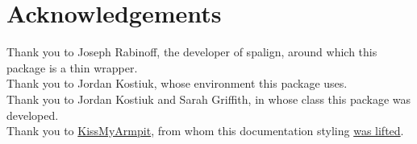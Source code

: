 \documentclass{article}
\begin{document}
\section{Acknowledgements}
Thank you to Joseph Rabinoff, the developer of spalign, around which this package is a thin wrapper.\\
Thank you to Jordan Kostiuk, whose environment this package uses.\\
Thank you to Jordan Kostiuk and Sarah Griffith, in whose class this package was developed.\\
Thank you to \href{https://tex.stackexchange.com/users/19356/kiss-my-armpit}{KissMyArmpit}, from whom this documentation styling \href{https://tex.stackexchange.com/questions/155770/printing-latex-command-without-compiling-it}{was lifted}.\\
\end{document}
